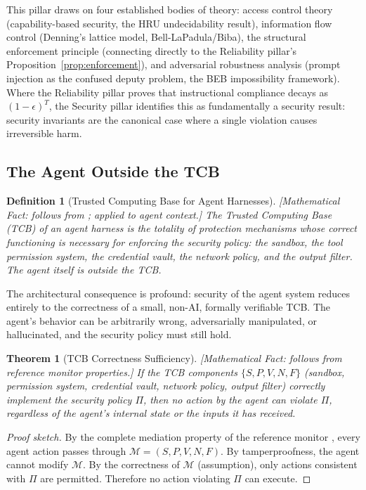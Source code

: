 \documentclass[11pt, a4paper]{googledeepmind}
\newtheorem{definition}{Definition}[section]
\newtheorem{theorem}{Theorem}[section]
\begin{document}
This pillar draws on four established bodies of theory: access control theory (capability-based security, the HRU undecidability result), information flow control (Denning's lattice model, Bell-LaPadula/Biba), the structural enforcement principle (connecting directly to the Reliability pillar's Proposition~\ref{prop:enforcement}), and adversarial robustness analysis (prompt injection as the confused deputy problem, the BEB impossibility framework). Where the Reliability pillar proves that instructional compliance decays as $(1-\epsilon)^T$, the Security pillar identifies this as fundamentally a security result: security invariants are the canonical case where a single violation causes irreversible harm.

\subsection{The Agent Outside the TCB}

\begin{definition}[Trusted Computing Base for Agent Harnesses]
\emph{[Mathematical Fact: follows from \citet{dod1985orange}; applied to agent context.]}
\label{def:tcb-security}
The Trusted Computing Base (TCB) of an agent harness is the totality of protection mechanisms whose correct functioning is necessary for enforcing the security policy: the sandbox, the tool permission system, the credential vault, the network policy, and the output filter. The agent itself is \emph{outside} the TCB.
\end{definition}

The architectural consequence is profound: security of the agent system reduces entirely to the correctness of a small, non-AI, formally verifiable TCB. The agent's behavior can be arbitrarily wrong, adversarially manipulated, or hallucinated, and the security policy must still hold.

\begin{theorem}[TCB Correctness Sufficiency]
\emph{[Mathematical Fact: follows from reference monitor properties.]}
\label{thm:tcb-sufficiency}
If the TCB components $\{S, P, V, N, F\}$ (sandbox, permission system, credential vault, network policy, output filter) correctly implement the security policy $\Pi$, then no action by the agent can violate $\Pi$, regardless of the agent's internal state or the inputs it has received.
\end{theorem}

\begin{proof}[Proof sketch]
By the complete mediation property of the reference monitor \citep{anderson1972reference}, every agent action passes through $\mathcal{M} = (S, P, V, N, F)$. By tamperproofness, the agent cannot modify $\mathcal{M}$. By the correctness of $\mathcal{M}$ (assumption), only actions consistent with $\Pi$ are permitted. Therefore no action violating $\Pi$ can execute.
\end{proof}
\end{document}
